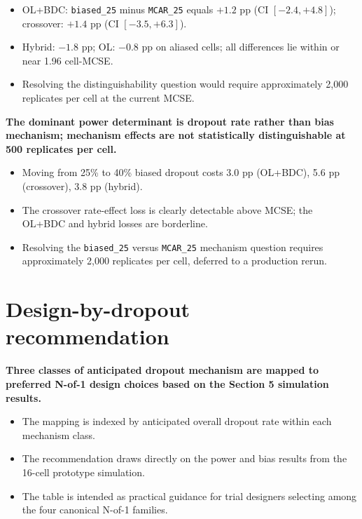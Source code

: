 \documentclass[
  11pt,
]{article}
\begin{document}
\begin{itemize}\setlength{\itemsep}{2pt}\setlength{\parskip}{0pt}
\item OL+BDC: \texttt{biased\_25} minus \texttt{MCAR\_25} equals $+1.2$ pp (CI $[-2.4, +4.8]$); crossover: $+1.4$ pp (CI $[-3.5, +6.3]$).
\item Hybrid: $-1.8$ pp; OL: $-0.8$ pp on aliased cells; all differences lie within or near 1.96 cell-MCSE.
\item Resolving the distinguishability question would require approximately 2,000 replicates per cell at the current MCSE.
\end{itemize}

\textbf{The dominant power determinant is dropout rate rather than bias mechanism; mechanism effects are not statistically distinguishable at 500 replicates per cell.}

\begin{itemize}\setlength{\itemsep}{2pt}\setlength{\parskip}{0pt}
\item Moving from 25\% to 40\% biased dropout costs 3.0 pp (OL+BDC), 5.6 pp (crossover), 3.8 pp (hybrid).
\item The crossover rate-effect loss is clearly detectable above MCSE; the OL+BDC and hybrid losses are borderline.
\item Resolving the \texttt{biased\_25} versus \texttt{MCAR\_25} mechanism question requires approximately 2,000 replicates per cell, deferred to a production rerun.
\end{itemize}

\section{Design-by-dropout recommendation}\label{design-by-dropout-recommendation}

\textbf{Three classes of anticipated dropout mechanism are mapped to preferred N-of-1 design choices based on the Section 5 simulation results.}

\begin{itemize}\setlength{\itemsep}{2pt}\setlength{\parskip}{0pt}
\item The mapping is indexed by anticipated overall dropout rate within each mechanism class.
\item The recommendation draws directly on the power and bias results from the 16-cell prototype simulation.
\item The table is intended as practical guidance for trial designers selecting among the four canonical N-of-1 families.
\end{itemize}
\end{document}
